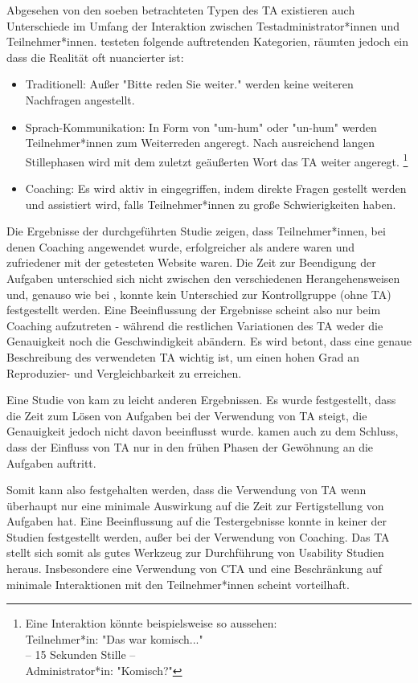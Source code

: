 Abgesehen von den soeben betrachteten Typen des \acl{TA} existieren auch Unterschiede im Umfang der Interaktion zwischen Testadministrator*innen und Teilnehmer*innen. \textcite{olmsted-hawalaThinkaloudProtocols2010} testeten folgende auftretenden Kategorien, räumten jedoch ein dass die Realität oft nuancierter ist:
\begin{itemize}
  \item Traditionell: Außer "Bitte reden Sie weiter." werden keine weiteren Nachfragen angestellt.
  \item Sprach-Kommunikation: In Form von "um-hum" oder "un-hum" werden Teilnehmer*innen zum Weiterreden angeregt. Nach ausreichend langen Stillephasen wird mit dem zuletzt geäußerten Wort das \acl{TA} weiter angeregt. \footnote{Eine Interaktion könnte beispielsweise so aussehen:\\ Teilnehmer*in: "Das war komisch..." \\ -- 15 Sekunden Stille -- \\ Administrator*in: "Komisch?"} 
  \item Coaching: Es wird aktiv in eingegriffen, indem direkte Fragen gestellt werden und assistiert wird, falls Teilnehmer*innen zu große Schwierigkeiten haben.
\end{itemize}
Die Ergebnisse der \citeyear{olmsted-hawalaThinkaloudProtocols2010} durchgeführten Studie zeigen, dass Teilnehmer*innen, bei denen Coaching angewendet wurde, erfolgreicher als andere waren und zufriedener mit der getesteten Website waren. Die Zeit zur Beendigung der Aufgaben unterschied sich nicht zwischen den verschiedenen Herangehensweisen und, genauso wie bei \citeauthor{alhadretiRethinkingThinking2018}, konnte kein Unterschied zur Kontrollgruppe (ohne \ac{TA}) festgestellt werden. Eine Beeinflussung der Ergebnisse scheint also nur beim Coaching aufzutreten - während die restlichen Variationen des \ac{TA} weder die Genauigkeit noch die Geschwindigkeit abändern. Es wird betont, dass eine genaue Beschreibung des verwendeten \acl{TA} wichtig ist, um einen hohen Grad an Reproduzier- und Vergleichbarkeit zu erreichen.

Eine Studie von \textcite{rheniusEvaluationConcurrent1990} kam zu leicht anderen Ergebnissen. Es wurde festgestellt, dass die Zeit zum Lösen von Aufgaben bei der Verwendung von \ac{TA} steigt, die Genauigkeit jedoch nicht davon beeinflusst wurde. \citeauthor{rheniusEvaluationConcurrent1990} kamen auch zu dem Schluss, dass der Einfluss von \ac{TA} nur in den frühen Phasen der Gewöhnung an die Aufgaben auftritt.
\parencite{rheniusEvaluationConcurrent1990}

Somit kann also festgehalten werden, dass die Verwendung von \ac{TA} wenn überhaupt nur eine minimale Auswirkung auf die Zeit zur Fertigstellung von Aufgaben hat. Eine Beeinflussung auf die Testergebnisse konnte in keiner der Studien festgestellt werden, außer bei der Verwendung von Coaching. Das \acl{TA} stellt sich somit als gutes Werkzeug zur Durchführung von Usability Studien heraus. Insbesondere eine Verwendung von \acl{CTA} und eine Beschränkung auf minimale Interaktionen mit den Teilnehmer*innen scheint vorteilhaft.
